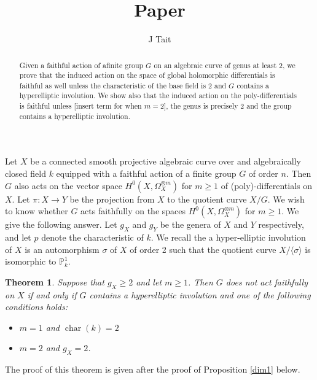 \documentclass[11pt]{article} %
\title{Paper}
\author{J Tait}
\newtheorem{thm}{Theorem}
\DeclareMathOperator{\cha}{char}
\begin{document}
\maketitle

\begin{abstract}
  Given a faithful action of afinite group $G$ on an algebraic curve of genus at least 2, we
prove that the induced action on the space of global
holomorphic differentials is faithful as well unless the
characteristic of the base field is  2 and $G$ contains a
hyperelliptic involution.
We show also that the induced action on the poly-differentials is faithful unless [insert term for when $m=2$], 
the genus is precisely 2 and the group contains a hyperelliptic involution.

\end{abstract}

Let $X$ be a connected smooth projective algebraic curve over and algebraically closed field $k$ equipped with a faithful action of a finite group $G$ of order $n$.
Then $G$ also acts on the vector space $H^0(X,\Omega_X^{\otimes m})$ for $m\geq 1$ of (poly)-differentials on $X$.
Let $\pi:X\rightarrow Y$ be the projection from $X$ to the quotient curve $X/G$.
We wish to know whether $G$ acts faithfully on the spaces $H^0(X,\Omega_X^{\otimes m})$ for $m\geq 1$.
We give the following answer.
Let $g_X$ and $g_Y$ be the genera of $X$ and $Y$ respectively, and let $p$ denote the characteristic of $k$.
We recall the a hyper-elliptic involution of $X$ is an automorphism $\sigma$ of $X$ of order 2 such that the quotient curve $X/\langle \sigma \rangle$ is isomorphic to $\mathbb{P}_k^1$.\\

  \begin{thm}
    Suppose that $g_X\geq 2$ and let $m\geq1$. 
    Then $G$ does not act faithfully on $X$ if and only if $G$ contains a hyperelliptic involution and one of the following conditions holds:
      \begin{itemize}
	\item $m=1$ and $\cha(k)=2$
	\item $m=2$ and $g_X=2$.
      \end{itemize}
  \end{thm}
The proof of this theorem is given after the proof of Proposition \ref{dim1} below.\\
\end{document}
